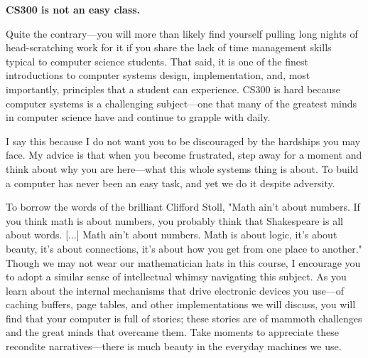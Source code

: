 \documentclass[a4paper, 12pt]{article}
\begin{document}
\begin{flushleft}
	\makebox[\linewidth]{\rule{\paperwidth}{0.4pt}}
	\textbf{CS300 is not an easy class.}

	Quite the contrary---you will more than likely find yourself pulling long nights of head-scratching work for it if you share the lack of time management skills typical to
	computer science students. That said, it is one of the finest introductions to computer systems design, implementation, and, most importantly, principles that a student can experience.
	CS300 is hard because computer systems is a challenging subject---one that many of the greatest minds in computer science have and continue to grapple with daily.

	I say this because I do not want you to be discouraged by the hardships you may face. My advice is that when you become frustrated, step away for a moment and think about
	why you are here---what this whole systems thing is about. To build a computer has never been an easy task, and yet we do it despite adversity.

	To borrow the words of the brilliant Clifford Stoll, "Math ain’t about numbers. If you think math is about numbers, you probably think that Shakespeare is all about words.
		[...] Math ain’t about numbers. Math is about logic, it’s about beauty, it’s about connections, it’s about how you get from one place to another." Though we may not wear our
	mathematician hats in this course, I encourage you to adopt a similar sense of intellectual whimsy navigating this subject. As you learn about the internal mechanisms that
	drive electronic devices you use---of caching buffers, page tables, and other implementations we will discuss, you will find that your computer is full of stories; these stories
	are of mammoth challenges and the great minds that overcame them. Take moments to appreciate these recondite narratives---there is much beauty in the everyday machines we use.

\end{flushleft}

\romantableofcontents
\end{document}
